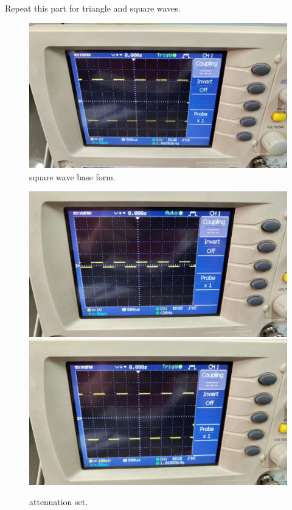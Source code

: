 \documentclass[11pt]{article}
\newcommand{\PicScale}{0.2}
\begin{document}
\begin{question}
\begin{subquestion}{Repeat this part for triangle and square waves.}
{    \begin{figure}[H]
        \begin{center}
            \includegraphics[scale=\PicScale]{Fig/13.jpeg}
            \caption{square wave base form.}
        \end{center}
    \end{figure}

    \begin{figure}[H]
        \begin{center}
            \includegraphics[scale=0.1]{Fig/14.jpeg}
            \includegraphics[scale=0.1]{Fig/15.jpeg}
            \caption{attenuation set.}
        \end{center}
    \end{figure}

}
\end{subquestion}
\end{question}
\end{document}
